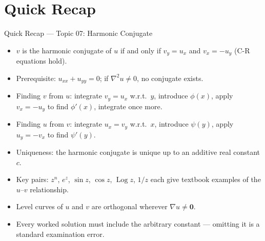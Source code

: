 \documentclass[12pt,a4paper]{article}
\begin{document}
\section{Quick Recap}

\begin{learnbox}{Quick Recap --- Topic 07: Harmonic Conjugate}
\begin{itemize}[leftmargin=1.5em]
  \item $v$ is the harmonic conjugate of $u$ if and only if $v_y=u_x$ and $v_x=-u_y$
        (C-R equations hold).
  \item Prerequisite: $u_{xx}+u_{yy}=0$; if $\nabla^2u\neq0$, no conjugate exists.
  \item Finding $v$ from $u$: integrate $v_y=u_x$ w.r.t.\ $y$, introduce $\phi(x)$,
        apply $v_x=-u_y$ to find $\phi'(x)$, integrate once more.
  \item Finding $u$ from $v$: integrate $u_x=v_y$ w.r.t.\ $x$, introduce $\psi(y)$,
        apply $u_y=-v_x$ to find $\psi'(y)$.
  \item Uniqueness: the harmonic conjugate is unique up to an additive real constant $c$.
  \item Key pairs: $z^n$, $e^z$, $\sin z$, $\cos z$, $\operatorname{Log}z$, $1/z$ each
        give textbook examples of the $u$--$v$ relationship.
  \item Level curves of $u$ and $v$ are orthogonal wherever $\nabla u\neq\mathbf{0}$.
  \item Every worked solution must include the arbitrary constant --- omitting it is a
        standard examination error.
\end{itemize}
\end{learnbox}
\end{document}
